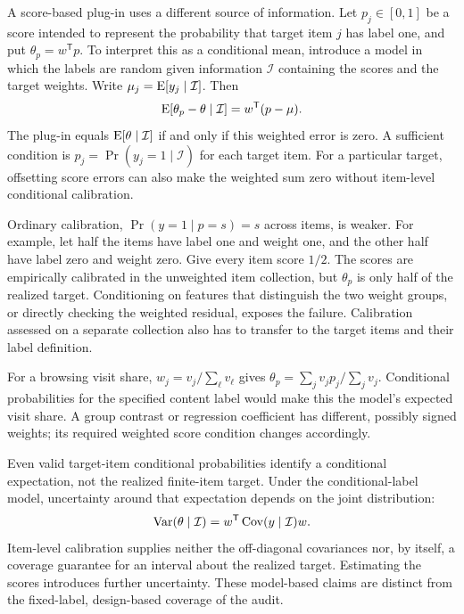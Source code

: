 A score-based plug-in uses a different source of information. Let
$p_j\in[0,1]$ be a score intended to represent the probability that target
item $j$ has label one, and put $\theta_p=w^{\mathsf T}p$. To interpret this as
a conditional mean, introduce a model in which the labels are random given
information $\mathcal I$ containing the scores and the target weights. Write
$\mu_j=\operatorname{E}[y_j\mid\mathcal I]$. Then
\begin{equation}\label{eq:scorebias}
 \operatorname{E}[\theta_p-\theta\mid\mathcal I]
 =w^{\mathsf T}(p-\mu).
\end{equation}
The plug-in equals $\operatorname{E}[\theta\mid\mathcal I]$ if and only if this weighted
error is zero. A sufficient condition is $p_j=\Pr(y_j=1\mid\mathcal I)$ for
each target item. For a particular target, offsetting score errors can also
make the weighted sum zero without item-level conditional calibration.

Ordinary calibration, $\Pr(y=1\mid p=s)=s$ across items, is weaker. For
example, let half the items have label one and weight one, and the other half
have label zero and weight zero. Give every item score $1/2$. The scores are
empirically calibrated in the unweighted item collection, but $\theta_p$ is only
half of the realized target. Conditioning on features that distinguish the
two weight groups, or directly checking the weighted residual, exposes the
failure. Calibration assessed on a separate collection also has to transfer
to the target items and their label definition.

For a browsing visit share, $w_j=v_j/\sum_\ell v_\ell$ gives
$\theta_p=\sum_jv_jp_j/\sum_jv_j$. Conditional probabilities for the specified
content label would make this the model's expected visit share. A group
contrast or regression coefficient has different, possibly signed weights;
its required weighted score condition changes accordingly.

Even valid target-item conditional probabilities identify a conditional
expectation, not the realized finite-item target. Under the conditional-label
model, uncertainty around that expectation depends on the joint distribution:
\begin{equation}\label{eq:scorevariance}
 \operatorname{Var}(\theta\mid\mathcal I)
 =w^{\mathsf T}\operatorname{Cov}(y\mid\mathcal I)w.
\end{equation}
Item-level calibration supplies neither the off-diagonal covariances nor, by
itself, a coverage guarantee for an interval about the realized target.
Estimating the scores introduces further uncertainty. These model-based claims
are distinct from the fixed-label, design-based coverage of the audit.
